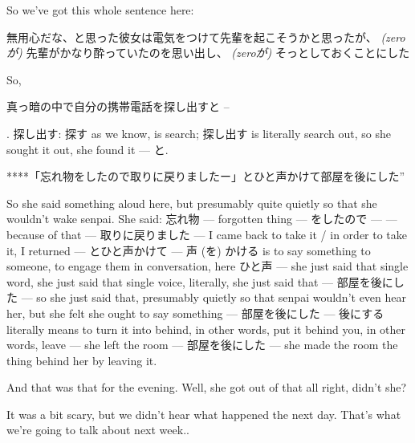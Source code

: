 So we've got this whole sentence here:

無用心だな、と思った彼女は電気をつけて先輩を起こそうかと思ったが、 {\em (zeroが)} 先輩がかなり酔っていたのを思い出し、 {\em (zeroが)} そっとしておくことにした

{}

So, 

真っ暗の中で自分の携帯電話を探し出すと --

{}

. 探し出す: 探す as we know, is search; 探し出す is literally search out, so she sought it out, she found it --- と.

****「忘れ物をしたので取りに戻りましたー」とひと声かけて部屋を後にした”

So she said something aloud here, but presumably quite quietly so that she wouldn't wake senpai. She said: 忘れ物 --- forgotten thing --- をしたので ---  --- because of that --- 取りに戻りました --- I came back to take it / in order to take it, I returned --- とひと声かけて --- 声 (を) かける is to say something to someone, to engage them in conversation, here ひと声 --- she just said that single word, she just said that single voice, literally, she just said that --- 部屋を後にした --- so she just said that, presumably quietly so that senpai wouldn't even hear her, but she felt she ought to say something --- 部屋を後にした --- 後にする literally means to turn it into behind, in other words, put it behind you, in other words, leave --- she left the room --- 部屋を後にした --- she made the room the thing behind her by leaving it.

And that was that for the evening. Well, she got out of that all right, didn't she?

It was a bit scary, but we didn't hear what happened the next day. That's what we're going to talk about next week..

\stopsectionlevel
